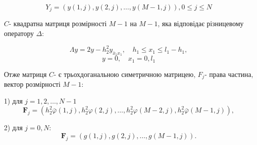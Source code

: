 $$ Y_j = (y(1, j), y(2, j), \dots , y(M-1, j)), 0\le j \le N $$

$C$- квадратна матриця розмірності $M-1$ на $M-1$, 
яка відповідає різницевому оператору $\Delta$:

$$\Lambda y =2 y-h_2^2 y_{\bar{x}_1 x_1}, \quad h_1 \le x_1 \le l_1-h_1,$$ 
$$y =0, \quad x_1=0, l_1$$

Отже матриця $C$- є трьохдоганальною симетричною матрицею, 
$F_j$- права частина, вектор розмірності $M-1$: 



1) для $j = 1, 2, \dots, N-1$
$$\boldsymbol{F}_j=\left(h_2^2 \bar{\varphi}(1, j), h_2^2 \varphi(2, j), \ldots, h_2^2 \varphi(M-2, j), h_2^2 \bar{\varphi}(M-1, j)\right),$$


2) для $j = 0, N$:
$$\boldsymbol{F}_j=(g(1, j), g(2, j), \ldots, g(M-1, j)).$$
